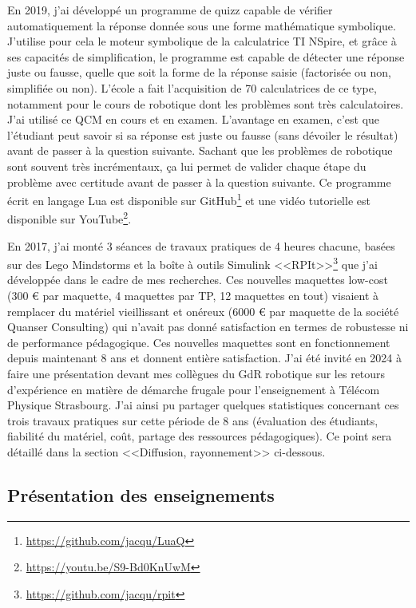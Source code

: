 \documentclass[a4paper,12pt]{article}
\begin{document}
En 2019, j'ai développé un programme de quizz capable de vérifier automatiquement la réponse donnée sous une forme mathématique symbolique. J'utilise pour cela le moteur symbolique de la calculatrice TI NSpire, et grâce à ses capacités de simplification, le programme est capable de détecter une réponse juste ou fausse, quelle que soit la forme de la réponse saisie (factorisée ou non, simplifiée ou non). L'école a fait l'acquisition de 70 calculatrices de ce type, notamment pour le cours de robotique dont les problèmes sont très calculatoires. J'ai utilisé ce QCM en cours et en examen. L'avantage en examen, c'est que l'étudiant peut savoir si sa réponse est juste ou fausse (sans dévoiler le résultat) avant de passer à la question suivante. Sachant que les problèmes de robotique sont souvent très incrémentaux, ça lui permet de valider chaque étape du problème avec certitude avant de passer à la question suivante. Ce programme écrit en langage Lua est disponible sur GitHub\footnote{\url{https://github.com/jacqu/LuaQ}} et une vidéo tutorielle est disponible sur YouTube\footnote{\url{https://youtu.be/S9-Bd0KnUwM}}.

En 2017, j'ai monté 3 séances de travaux pratiques de 4 heures chacune, basées sur des Lego Mindstorms et la boîte à outils Simulink <<RPIt>>\footnote{\url{https://github.com/jacqu/rpit}} que j'ai développée dans le cadre de mes recherches. Ces nouvelles maquettes low-cost (300 € par maquette, 4 maquettes par TP, 12 maquettes en tout) visaient à remplacer du matériel vieillissant et onéreux (6000 € par maquette de la société Quanser Consulting) qui n'avait pas donné satisfaction en termes de robustesse ni de performance pédagogique. Ces nouvelles maquettes sont en fonctionnement depuis maintenant 8 ans et donnent entière satisfaction. J'ai été invité en 2024 à faire une présentation devant mes collègues du GdR robotique sur les retours d'expérience en matière de démarche frugale pour l'enseignement à Télécom Physique Strasbourg. J'ai ainsi pu partager quelques statistiques concernant ces trois travaux pratiques sur cette période de 8 ans (évaluation des étudiants, fiabilité du matériel, coût, partage des ressources pédagogiques). Ce point sera détaillé dans la section <<Diffusion, rayonnement>> ci-dessous.

\subsection{Présentation des enseignements}
\end{document}
